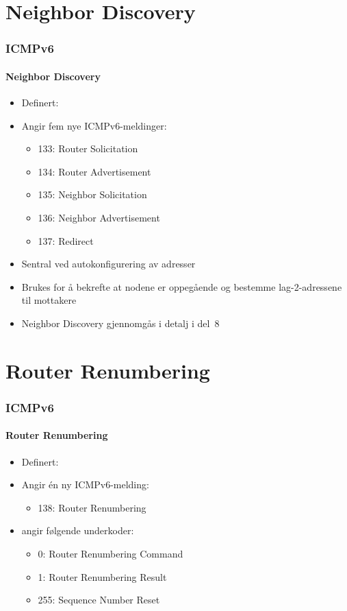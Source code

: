 \section{Neighbor Discovery}
\begin{frame}%
  \frametitle{ICMPv6}
  \framesubtitle{Neighbor Discovery}
  \pause
  \begin{itemize}[<+->]
  \item Definert: 
  \item Angir fem nye ICMPv6-meldinger:
    \begin{itemize}[<+->]
    \item 133: Router Solicitation
    \item 134: Router Advertisement
    \item 135: Neighbor Solicitation
    \item 136: Neighbor Advertisement
    \item 137: Redirect
    \end{itemize}
  \item Sentral ved autokonfigurering av adresser
  \item Brukes for å bekrefte at nodene er oppegående og bestemme
    lag-2-adressene til mottakere
  \item Neighbor Discovery gjennomgås i detalj i del~8
  \end{itemize}
\end{frame}

\section{Router Renumbering}
\begin{frame}%
  \frametitle{ICMPv6}
  \framesubtitle{Router Renumbering}
  \begin{itemize}%
  \item Definert: 
  \item Angir én ny ICMPv6-melding:
    \begin{itemize}%
    \item 138: Router Renumbering
    \end{itemize}
  \item {} angir
    følgende underkoder:
    \begin{itemize}%
    \item 0: Router Renumbering Command
    \item 1: Router Renumbering Result
    \item 255: Sequence Number Reset
    \end{itemize}
  \end{itemize}
\end{frame}


